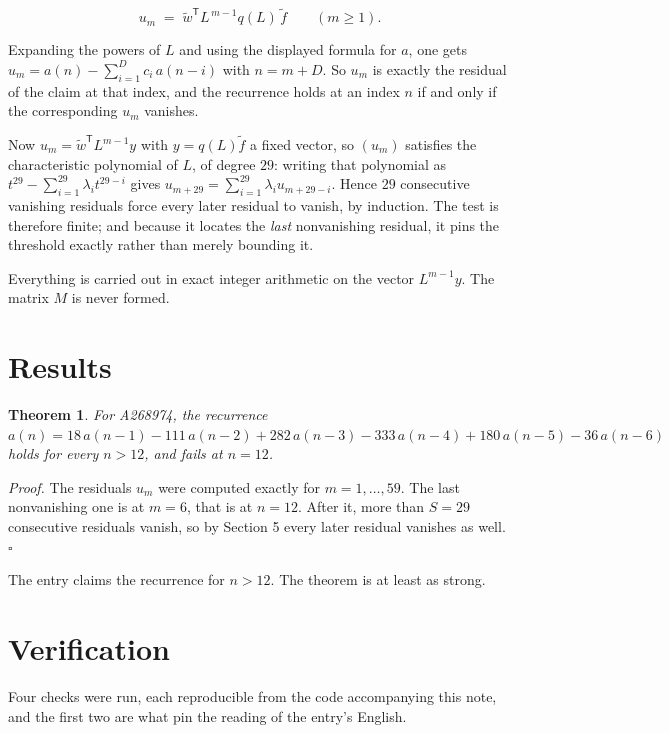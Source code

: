 \documentclass[11pt]{article}
\newtheorem{theorem}{Theorem}
\theoremstyle{definition}
\begin{document}
\[u_m \;=\; \tilde w^{\mathsf T} L^{\,m-1} q(L)\,\tilde f \qquad (m \ge 1).\]

Expanding the powers of $L$ and using the displayed formula for $a$, one gets $u_m = a(n) - \sum_{i=1}^{D} c_i\,a(n-i)$ with $n = m + D$. So $u_m$ is exactly the residual of the claim at that index, and the recurrence holds at an index $n$ if and only if the corresponding $u_m$ vanishes.

Now $u_m = \tilde w^{\mathsf T} L^{m-1} y$ with $y = q(L)\tilde f$ a fixed vector, so $(u_m)$ satisfies the characteristic polynomial of $L$, of degree $29$: writing that polynomial as $t^{29} - \sum_{i=1}^{29} \lambda_i t^{29-i}$ gives $u_{m+29} = \sum_{i=1}^{29} \lambda_i u_{m+29-i}$. Hence $29$ consecutive vanishing residuals force every later residual to vanish, by induction. The test is therefore finite; and because it locates the {\itshape last} nonvanishing residual, it pins the threshold exactly rather than merely bounding it.

Everything is carried out in exact integer arithmetic on the vector $L^{m-1}y$. The matrix $M$ is never formed.

\section{Results}

\begin{theorem} For A268974, the recurrence $a(n) = 18\,a(n-1) - 111\,a(n-2) + 282\,a(n-3) - 333\,a(n-4) + 180\,a(n-5) - 36\,a(n-6)$ holds for every $n > 12$, and fails at $n = 12$.\end{theorem}

{\itshape Proof.} The residuals $u_m$ were computed exactly for $m = 1,\dots,59$. The last nonvanishing one is at $m = 6$, that is at $n = 12$. After it, more than $S = 29$ consecutive residuals vanish, so by Section 5 every later residual vanishes as well. $\square$

The entry claims the recurrence for $n > 12$. The theorem is at least as strong.

\section{Verification}

Four checks were run, each reproducible from the code accompanying this note, and the first two are what pin the reading of the entry's English.
\end{document}
